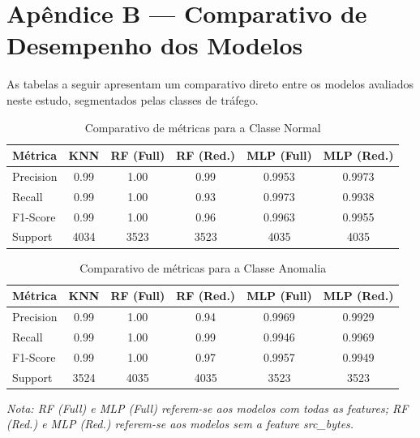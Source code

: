 \section*{Apêndice B — Comparativo de Desempenho dos Modelos}

As tabelas a seguir apresentam um comparativo direto entre os modelos avaliados neste estudo, segmentados pelas classes de tráfego.

\begin{table}[H]
\centering
\caption{Comparativo de métricas para a Classe Normal}
\label{tab:comparativo_normal}
\footnotesize
\begin{tabular}{|l|c|c|c|c|c|}
\hline
\textbf{Métrica} & \textbf{KNN} & \textbf{RF (Full)} & \textbf{RF (Red.)} & \textbf{MLP (Full)} & \textbf{MLP (Red.)} \\ \hline
Precision & 0.99 & 1.00 & 0.99 & 0.9953 & 0.9973 \\ \hline
Recall    & 0.99 & 1.00 & 0.93 & 0.9973 & 0.9938 \\ \hline
F1-Score  & 0.99 & 1.00 & 0.96 & 0.9963 & 0.9955 \\ \hline
Support   & 4034 & 3523 & 3523 & 4035   & 4035   \\ \hline
\end{tabular}
\end{table}

\begin{table}[H]
\centering
\caption{Comparativo de métricas para a Classe Anomalia}
\label{tab:comparativo_anomalia}
\footnotesize
\begin{tabular}{|l|c|c|c|c|c|}
\hline
\textbf{Métrica} & \textbf{KNN} & \textbf{RF (Full)} & \textbf{RF (Red.)} & \textbf{MLP (Full)} & \textbf{MLP (Red.)} \\ \hline
Precision & 0.99 & 1.00 & 0.94 & 0.9969 & 0.9929 \\ \hline
Recall    & 0.99 & 1.00 & 0.99 & 0.9946 & 0.9969 \\ \hline
F1-Score  & 0.99 & 1.00 & 0.97 & 0.9957 & 0.9949 \\ \hline
Support   & 3524 & 4035 & 4035 & 3523   & 3523   \\ \hline
\end{tabular}
\end{table}

\textit{Nota: RF (Full) e MLP (Full) referem-se aos modelos com todas as features; RF (Red.) e MLP (Red.) referem-se aos modelos sem a feature src\_bytes.}
